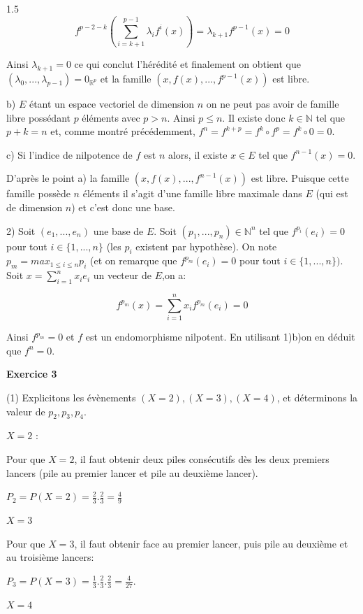 \documentclass[12pt]{article}
\begin{document}
\begin{spacing}{1.5}
 \[f^{p-2-k}(\sum_{i=k+1}^{p-1}\lambda_if^i(x))=\lambda_{k+1}f^{p-1}(x)=0\]
 
  Ainsi $\lambda_{k+1} = 0$ ce qui conclut l'hérédité et finalement on obtient que $(\lambda_0,...,\lambda_{p-1}) = 0_{\mathbb{R}^p}$
 et la famille $(x,f(x),...,f^{p-1}(x))$ est libre.
 
 b) $E$ étant un espace vectoriel de dimension $n$ on ne peut pas avoir de famille libre possédant $p$ éléments avec $p > n$. Ainsi $p\leqslant n$. Il existe donc $k\in \mathbb{N}$ tel que $p+k = n$ et,
 comme montré précédemment, $f^n = f^{k+p} = f^k\circ f^p = f^k\circ 0 = 0$.
 
 c) Si l'indice de nilpotence de $f$ est $n$ alors, il existe $x\in E$ tel que $f^{n-1}(x)= 0$.
 
 D'après le point a) la famille $(x,f(x),...,f^{n-1}(x))$ est libre. Puisque cette famille possède $n$ éléments il s'agit d'une famille libre maximale dans $E$ (qui est de dimension $n$) et c'est donc une base.
 
 2) Soit $(e_1,...,e_n)$ une base de $E$. Soit $(p_1,...,p_n)\in \mathbb{N}^n$ tel que $f^{p_i}(e_i) = 0$ pour tout $i\in \{1,...,n\}$ (les $p_i$ existent par hypothèse). On note $p_m = max_{1\leqslant i\leqslant n}p_i$ (et on remarque que $f^{p_m}(e_i)=0$ pour tout $i\in \{1,...,n\})$. Soit $x=\sum_{i=1}^nx_ie_i$ un vecteur de $E$,on a:
 
 \[
 f^{p_m}(x)=\sum_{i=1}^nx_if^{p_m}(e_i)=0
 \]
 
 Ainsi $f^{p_m}=0$ et $f$ est un endomorphisme nilpotent. En utilisant 1)b)on en déduit que
 $f^n=0$.
 
 \medskip\textbf{Exercice 3}
 
 
 (1) Explicitons les évènements $(X = 2), (X = 3), (X = 4)$, et déterminons la valeur de $p_2,
 p_3, p_4$.
 
$X=2$ :

Pour que $X=2$, il faut obtenir deux piles consécutifs dès les deux premiers lancers (pile au premier lancer et pile au deuxième lancer).
 
 $P_2=P(X=2)=\frac{2}{3}.\frac{2}{3}=\frac{4}{9}$
 
 \medskip
 
 $X=3$
 
 Pour que $X=3$,  il faut obtenir face au premier lancer, puis pile au deuxième et au troisième lancers:
 
 $P_3=P(X=3)=\frac{1}{3}.\frac{2}{3}.\frac{2}{3}=\frac{4}{27}$.
 
 \medskip
 $X=4$
 

\end{spacing}
\end{document}

